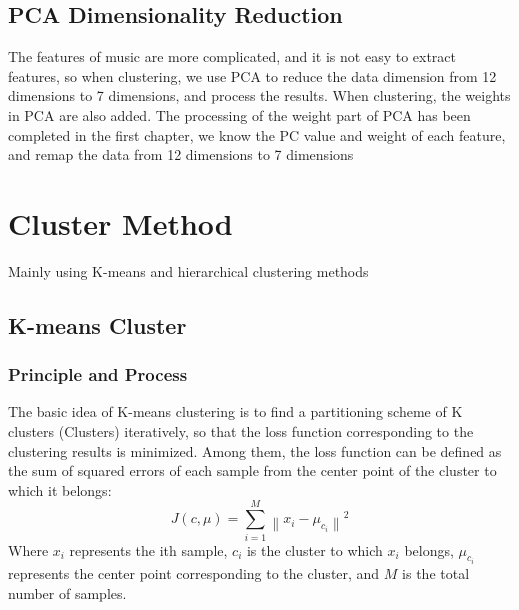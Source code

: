 \subsection{PCA Dimensionality Reduction}
The features of music are more complicated, and it is not easy to extract features, so when clustering, we use PCA to reduce the data dimension from 12 dimensions to 7 dimensions, and process the results. When clustering, the weights in PCA are also added. The processing of the weight part of PCA has been completed in the first chapter, we know the PC value and weight of each feature, and remap the data from 12 dimensions to 7 dimensions



\section{Cluster Method}
Mainly using K-means and hierarchical clustering methods\\
\subsection{K-means Cluster}
\subsubsection{Principle and Process}
The basic idea of K-means clustering is to find a partitioning scheme of K clusters (Clusters) iteratively, so that the loss function corresponding to the clustering results is minimized. Among them, the loss function can be defined as the sum of squared errors of each sample from the center point of the cluster to which it belongs:
\begin{equation}
    J(c, \mu)=\sum_{i=1}^{M}\left\|x_{i}-\mu_{c_{i}}\right\|^{2}
\end{equation}
Where $x_i$ represents the ith sample, $c_i$ is the cluster to which $x_i$ belongs, $\mu_{c_i}$ represents the center point corresponding to the cluster, and $M$ is the total number of samples.

